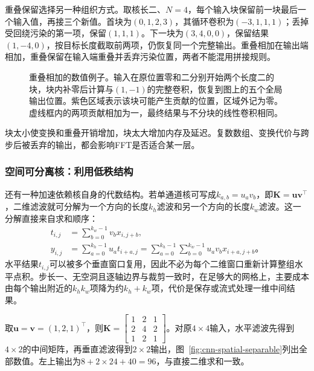 重叠保留选择另一种组织方式。取核长二、$N=4$，每个输入块保留前一块最后一个输入值，再接三个新值。首块为$(0,1,2,3)$，其循环卷积为$(-3,1,1,1)$；丢掉受回绕污染的第一项，保留$(1,1,1)$。下一块为$(3,4,0,0)$，保留结果$(1,-4,0)$，按目标长度截取前两项，仍恢复同一个完整输出。重叠相加在输出端相加，重叠保留在输入端重叠并丢弃污染位置，两者不能混用拼接规则。

\begin{figure}[htb]
  \centering
  
  \caption{重叠相加的数值例子。输入在原位置零和二分别开始两个长度二的块，块内补零后计算与$(1,-1)$的完整卷积，恢复到图上的五个全局输出位置。紫色区域表示该块可能产生贡献的位置，区域外记为零。虚线框内的两项贡献相加为一，最终结果与不分块的线性卷积相同。}
  \label{fig:cnn-fft-blocks}
\end{figure}

块太小使变换和重叠开销增加，块太大增加内存及延迟。复数数组、变换代价与跨步后被丢弃的输出，都会影响FFT是否适合某一层。

\subsubsection{空间可分离核：利用低秩结构}
\label{sec:cnn-separable-implementation}

还有一种加速依赖核自身的代数结构。若单通道核可写成$k_{a,b}=u_a v_b$，即$\bm K=\bm u\bm v^\top$，二维滤波就可分解为一个方向的长度$k_h$滤波和另一个方向的长度$k_w$滤波。这一分解直接来自求和顺序：
\begin{equation}
  \begin{aligned}
    t_{i,j}&=\sum_{b=0}^{k_w-1}v_bx_{i,j+b},\\
    y_{i,j}&=\sum_{a=0}^{k_h-1}u_at_{i+a,j}
      =\sum_{a=0}^{k_h-1}\sum_{b=0}^{k_w-1}
          u_av_bx_{i+a,j+b}\text{。}
  \end{aligned}
  \label{eq:cnn-spatial-separable-derivation}
\end{equation}
水平结果$t_{i,j}$可以被多个垂直窗口复用，因此不必为每个二维窗口重新计算整组水平点积。步长一、无空洞且逐轴边界与裁剪一致时，在足够大的网格上，主要成本由每个输出附近的$k_hk_w$项降为约$k_h+k_w$项，代价是保存或流式处理一维中间结果。

取$\bm u=\bm v=(1,2,1)^\top$，则$\bm K=\left[\begin{smallmatrix}1&2&1\\2&4&2\\1&2&1\end{smallmatrix}\right]$。对原$4\times4$输入，水平滤波先得到$4\times2$的中间矩阵，再垂直滤波得到$2\times2$输出，图~\ref{fig:cnn-spatial-separable}列出全部数值。左上输出为$8+2\times24+40=96$，与直接二维求和一致。

